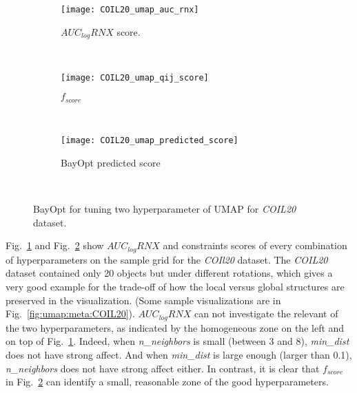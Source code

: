 \begin{figure}[]%
    \begin{subfigure}[b]{.78\linewidth}
        \texttt{[image: COIL20\_umap\_auc\_rnx]}
        \caption{$AUC_{log}RNX$ score.}
        \label{fig:bo:umap:COIL20:rnx}
    \end{subfigure}
    ~
    \begin{subfigure}[b]{.78\linewidth}
        \texttt{[image: COIL20\_umap\_qij\_score]}
        \caption{$f_{score}$}
        \label{fig:bo:umap:COIL20:fscore}
    \end{subfigure}
    ~
    \begin{subfigure}[b]{\linewidth}
        \centering
        \texttt{[image: COIL20\_umap\_predicted\_score]}
        \caption{BayOpt predicted score}
        \label{fig:bo:umap:COIL20:prediction}
    \end{subfigure}
    ~
    \caption{BayOpt for tuning two hyperparameter of UMAP for \emph{COIL20} dataset.}
    \label{fig:bo:umap:COIL20}
\end{figure}

Fig.~\ref{fig:bo:umap:COIL20:rnx} and Fig.~\ref{fig:bo:umap:COIL20:fscore} show $AUC_{log}RNX$ and constraints scores of every combination of hyperparameters on the sample grid for the \emph{COIl20} dataset.
The \emph{COIL20} dataset contained only 20 objects but under different rotations, which gives a very good example for the trade-off of how the local versus global structures are preserved in the visualization. (Some sample visualizations are in Fig.~\ref{fig:umap:meta:COIL20}).
$AUC_{log}RNX$ can not investigate the relevant of the two hyperparameters, as indicated by the homogeneous zone on the left and on top of Fig.~\ref{fig:bo:umap:COIL20:rnx}.
Indeed, when \emph{n\_neighbors} is small (between 3 and 8), \emph{min\_dist} does not have strong affect. And when \emph{min\_dist} is large enough (larger than 0.1), \emph{n\_neighbors} does not have strong affect either.
In contrast, it is clear that $f_{score}$ in Fig.~\ref{fig:bo:umap:COIL20:fscore} can identify a small, reasonable zone of the good hyperparameters.

\begin{figure*}
    \centering
    \begin{subfigure}[b]{.8\linewidth}
        \centering
        \texttt{[image: \{COIL20\_umap\_metamap]}.png}
    \end{subfigure}
    ~
    \begin{subfigure}[b]{.8\linewidth}
        \texttt{[image: COIL20\_umap\_show]}
    \end{subfigure}
    \caption{Metamaps and sample visualizations with selected hyperparameters for the \emph{COIL20} dataset.}
    \label{fig:umap:meta:COIL20}
\end{figure*}

